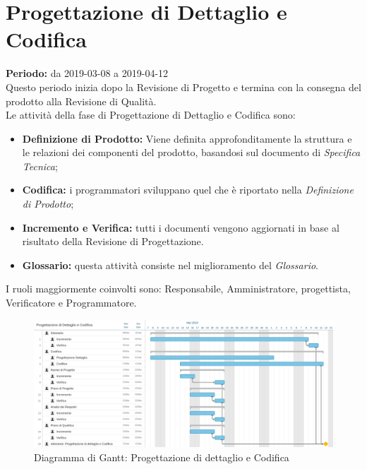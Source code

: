 \section{Progettazione di Dettaglio e Codifica}
\textbf{Periodo:} da 2019-03-08 a 2019-04-12\\
Questo periodo inizia dopo la Revisione di Progetto e termina con la consegna del prodotto alla Revisione di Qualità.\\Le attività della fase di Progettazione di Dettaglio e Codifica sono:
\begin{itemize}
    \item \textbf{Definizione di Prodotto:} Viene definita approfonditamente la struttura e le relazioni dei componenti del prodotto, basandosi sul documento di \textit{Specifica Tecnica};
    \item \textbf{Codifica:} i programmatori sviluppano quel che è riportato nella \textit{Definizione di Prodotto};
    \item \textbf{Incremento e Verifica:} tutti i documenti vengono aggiornati in base al risultato della Revisione di Progettazione.
    \item \textbf{Glossario:} questa attività consiste nel miglioramento del \textit{Glossario}.
\end{itemize}
I ruoli maggiormente coinvolti sono: Responsabile, Amministratore, progettista, Verificatore e Programmatore.
\begin{figure} [h]
    \centering
    \includegraphics[scale=0.1]{./images/codifica.jpg}
    \caption{Diagramma di Gantt: Progettazione di dettaglio e Codifica }\label{}
\end{figure}
